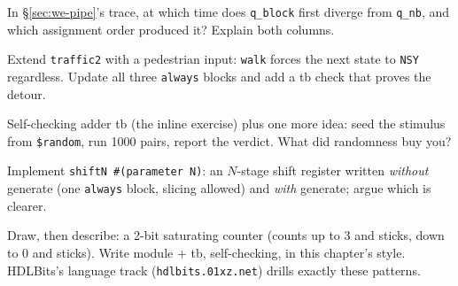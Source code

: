 \begin{exercise}[medium]
In \S\ref{sec:we-pipe}'s trace, at which time does \texttt{q\_block}
first diverge from \texttt{q\_nb}, and which assignment order produced
it? Explain both columns.
\end{exercise}
\begin{exercise}[hard]
Extend \texttt{traffic2} with a pedestrian input: \texttt{walk} forces
the next state to \texttt{NSY} regardless. Update all three
\texttt{always} blocks and add a tb check that proves the detour.
\end{exercise}
\begin{exercise}[hard]
Self-checking adder tb (the inline exercise) plus one more idea: seed
the stimulus from \texttt{\$random}, run 1000 pairs, report the verdict.
What did randomness buy you?
\end{exercise}
\begin{exercise}[hard]
Implement \texttt{shiftN \#(parameter N)}: an $N$-stage shift register
written \emph{without} generate (one \texttt{always} block, slicing
allowed) and \emph{with} generate; argue which is clearer.
\end{exercise}
\begin{exercise}[hard]
Draw, then describe: a 2-bit saturating counter (counts up to 3 and
sticks, down to 0 and sticks). Write module + tb, self-checking, in
this chapter's style. HDLBits's language track
(\texttt{hdlbits.01xz.net}) drills exactly these patterns.
\end{exercise}

